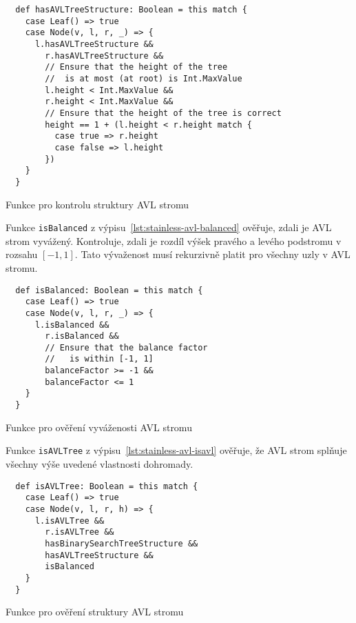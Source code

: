 \begin{listing}[H]
  \begin{verbatim}
  def hasAVLTreeStructure: Boolean = this match {
    case Leaf() => true
    case Node(v, l, r, _) => {
      l.hasAVLTreeStructure &&
        r.hasAVLTreeStructure &&
        // Ensure that the height of the tree
        //  is at most (at root) is Int.MaxValue
        l.height < Int.MaxValue &&
        r.height < Int.MaxValue &&
        // Ensure that the height of the tree is correct
        height == 1 + (l.height < r.height match {
          case true => r.height
          case false => l.height
        })
    }
  }
  \end{verbatim}
  \caption{Funkce pro kontrolu struktury AVL stromu}
  \label{lst:stainless-avl-avl}
\end{listing}

Funkce \texttt{isBalanced} z výpisu~\ref{lst:stainless-avl-balanced}
ověřuje, zdali je AVL strom vyvážený.
Kontroluje, zdali je rozdíl výšek pravého a levého podstromu
v rozsahu $[-1, 1]$.
Tato vývaženost musí rekurzivně platit pro všechny uzly v AVL stromu.

\begin{listing}[H]
  \begin{verbatim}
  def isBalanced: Boolean = this match {
    case Leaf() => true
    case Node(v, l, r, _) => {
      l.isBalanced &&
        r.isBalanced &&
        // Ensure that the balance factor
        //   is within [-1, 1]
        balanceFactor >= -1 &&
        balanceFactor <= 1
    }
  }
  \end{verbatim}
  \caption{Funkce pro ověření vyváženosti AVL stromu}
  \label{lst:stainless-avl-balanced}
\end{listing}

Funkce \texttt{isAVLTree} z výpisu~\ref{lst:stainless-avl-isavl}
ověřuje, že AVL strom splňuje všechny výše uvedené vlastnosti dohromady.

\begin{listing}[H]
  \begin{verbatim}
  def isAVLTree: Boolean = this match {
    case Leaf() => true
    case Node(v, l, r, h) => {
      l.isAVLTree &&
        r.isAVLTree &&
        hasBinarySearchTreeStructure &&
        hasAVLTreeStructure &&
        isBalanced
    }
  }
  \end{verbatim}
  \caption{Funkce pro ověření struktury AVL stromu}
  \label{lst:stainless-avl-isavl}
\end{listing}

